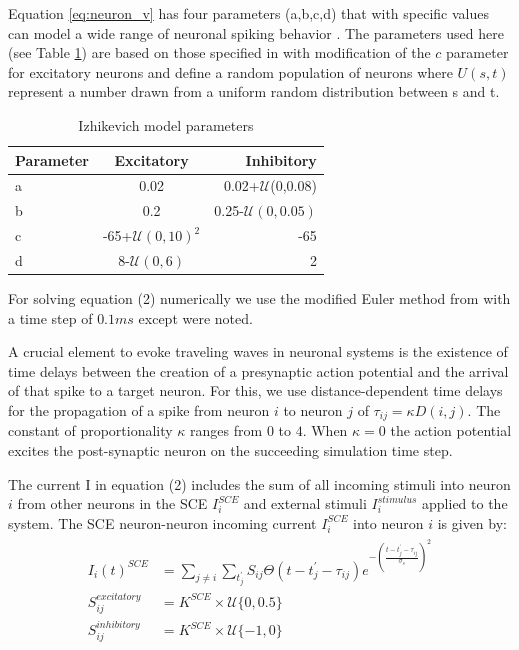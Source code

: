 \documentclass[12pt]{article}
\begin{document}
Equation \ref{eq:neuron_v} has four parameters (a,b,c,d) that with specific values can model a wide range of neuronal spiking behavior \parencite{izhikevich2003}. 
The parameters used here (see Table \ref{tab:izzy_params}) are based on those specified in \parencite{izhikevich2003} with modification of the $c$ parameter for excitatory neurons and define a random population of neurons where $U(s,t)$ represent a number drawn from a uniform random distribution between s and t. 
\begin{table}[!htb]
 \caption{Izhikevich model parameters}
 \label{tab:izzy_params}
 \centering
 \begin{tabular}{l|c|r}
  \textbf{Parameter} & \textbf{Excitatory} & \textbf{Inhibitory} \\
  \hline
  a & 0.02 & 0.02+$\mathcal{U}$(0,0.08) \\
  b & 0.2 & 0.25-$\mathcal{U}(0,0.05)$\\
  c & -65+$\mathcal{U}(0,10)^2$ & -65 \\
  d & 8-$\mathcal{U}(0,6)$& 2 \\
 \end{tabular}
\end{table}
For solving equation (2) numerically we use the modified Euler method from \parencite{izhikevich2003} with a time step of $0.1 ms$ except were noted. 

A crucial element to evoke traveling waves in neuronal systems is the existence of time delays between the creation of a presynaptic action potential and the arrival of that spike to a target neuron. 
For this, we use distance-dependent time delays for the propagation of a spike from neuron $i$ to neuron $j$ of $\tau_{ij} = \kappa  D(i,j)$. 
The constant of proportionality $\kappa$ ranges from $0$ to $4$.
When $\kappa=0$ the action potential excites the post-synaptic neuron on the succeeding simulation time step.
 
The current I in equation (2) includes the sum of all incoming stimuli into neuron $i$ from other neurons in the SCE $I_i^{SCE}$ and external stimuli $I_i^{stimulus}$ applied to the system. 
The SCE neuron-neuron incoming current $I_i^{SCE}$ into neuron $i$ is given by:
\begin{align}
 \begin{split}
  I_i(t)^{SCE} &= \sum_{j\ne i} \sum_{t^\prime_j} S_{ij}  \Theta(t-t^\prime_j-\tau_{ij})e^{-(\frac{t-t^\prime_j-\tau_{ij}}{\sigma_s})^2}\\
  S_{ij}^{excitatory} &= K^{SCE} \times \mathcal{U}\{0,0.5 \} \\
  S_{ij}^{inhibitory} &= K^{SCE} \times \mathcal{U}\{-1,0 \} 
 \end{split}
\end{align}
\end{document}
